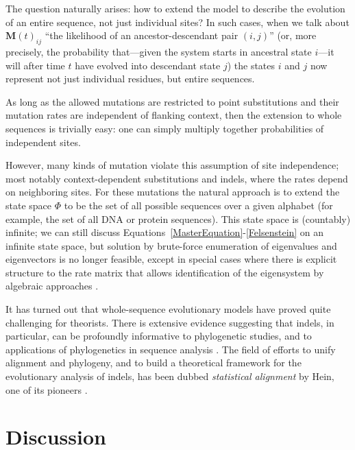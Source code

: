 \documentclass{bmcart}
\newcommand{\matr}[1]{\mathbf{#1}}
\newcommand{\statespace}{\Phi}
\newcommand{\condmatrix}{\matr{M}}
\begin{document}
The question naturally arises: how to extend the model to describe the evolution of an entire sequence,
not just individual sites?
\color{red}
In such cases, when we talk about $\condmatrix(t)_{ij}$ ``the likelihood of an ancestor-descendant pair $(i,j)$''
(or, more precisely, the probability that---given the system starts in ancestral state $i$---it will after time $t$ have evolved into descendant state $j$)
the states $i$ and $j$ now represent not just individual residues, but entire sequences.
\color{black}

As long as the allowed mutations are restricted to point substitutions
and their mutation rates are independent of flanking context,
then the extension to whole sequences is trivially easy:
one can simply multiply together probabilities of independent sites.

However, many kinds of mutation violate this assumption of site independence;
most notably context-dependent substitutions and indels, where the rates depend on neighboring sites.
For these mutations the natural approach is to extend the state space $\statespace$
to be the set of all possible sequences over a given alphabet
(for example, the set of all DNA or protein sequences).
This state space is (countably) infinite;
we can still discuss Equations~\ref{MasterEquation}-\ref{Felsenstein}
on an infinite state space,
but solution by brute-force enumeration of eigenvalues and eigenvectors is no longer feasible,
\color{red}
except in special cases where there is explicit structure to the rate matrix that allows identification of the eigensystem by algebraic approaches
\cite{LunterHein04,pmid21827770,pmid26135206}.
\color{black}

It has turned out that whole-sequence evolutionary models have proved quite challenging for theorists.
There is extensive evidence suggesting that indels, in particular, can be profoundly informative to phylogenetic studies,
and to applications of phylogenetics in sequence analysis \cite{pmid8445636,pmid15276848,pmid18578882,pmid23475937,pmid19958081,pmid16354754}.
The field of efforts to unify alignment and phylogeny,
and to build a theoretical framework for the evolutionary analysis of indels,
has been dubbed
{\em statistical alignment} by Hein, one of its pioneers \cite{HeinEtal2000}.

\section*{Discussion}
\end{document}
